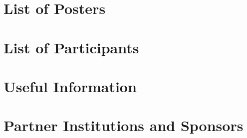 \documentclass[openany, parskip=full, 12pt, a4]{scrbook}
\begin{document}


\chapter{List of Posters} 

\vspace{-2.5em}





\chapter{List of Participants}
 

 
\chapter{Useful Information}



\chapter{Partner Institutions and Sponsors}



\newpage


\pagecolor{myblue}
\thispagestyle{empty}
\mbox{}
\end{document}
